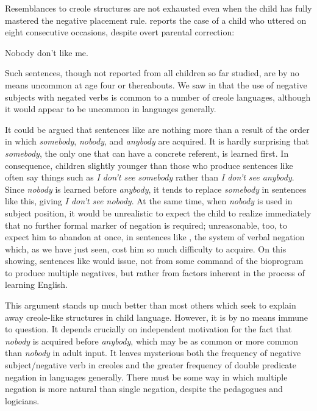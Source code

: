 Resemblances to creole structures are not exhausted even when the child has fully mastered the negative placement rule. \citet{McNeill1966} reports the case of a child who uttered  on eight consecutive occasions, despite overt parental correction:

\ea\label{ex:3:63}
Nobody don't like me. 
\z

\noindent Such sentences, though not reported from all children so far studied, are by no means uncommon at age four or thereabouts. We saw in  that the use of negative subjects with negated verbs is common to a number of creole languages, although it would appear to be uncommon in languages generally.

It could be argued that sentences like  are nothing more than a result of the order in which \textit{somebody}, \textit{nobody}, and \textit{anybody} are acquired. It is hardly surprising that \textit{somebody}, the only one that can have a concrete referent, is learned first. In consequence, children slightly younger than those who produce sentences like  often say things such as \textit{I don't see somebody} rather than \textit{I don't see anybody}. Since \textit{nobody} is learned before \textit{anybody}, it tends to replace \textit{somebody} in sentences like this, giving \textit{I don't see nobody}. At the same time, when \textit{nobody} is used in subject position, it would be unrealistic to expect the child to realize immediately that no further formal marker of negation is required; unreasonable, too, to expect him to abandon at once, in sentences like , the system of verbal negation which, as we have just seen, cost him so much difficulty to acquire. On this showing, sentences like  would issue, not from some command of the bioprogram to produce multiple negatives, but rather from factors inherent in the process of learning English.

This argument stands up much better than most others which seek to explain away creole-like structures in child language. However, it is by no means immune to question. It depends crucially on independent motivation for the fact that \textit{nobody} is acquired before \textit{anybody}, which may be as common or more common than \textit{nobody} in adult input. It leaves mysterious both the frequency of negative subject/negative verb in creoles and the greater frequency of double predicate negation in languages generally. There must be some way in which multiple negation is more natural than single negation, despite the pedagogues and logicians.

